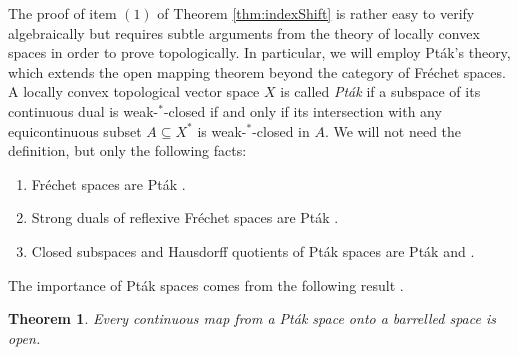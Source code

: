 \documentclass[12pt,reqno]{amsart}
\newtheorem{theorem}{Theorem}[section]
\theoremstyle{definition}
\begin{document}
The proof of item $(1)$ of Theorem \ref{thm:indexShift} is rather easy to verify algebraically but requires subtle arguments from the theory of locally convex spaces in order to prove topologically. In particular, we will employ Pt\'ak's theory, which extends the open mapping theorem beyond the category of Fr\'echet spaces. A locally convex topological vector space $X$ is called \emph{Pt\'ak} if a subspace of its continuous dual is weak-$^*$-closed if and only if its intersection with any equicontinuous subset $A \subseteq X^*$ is weak-$^*$-closed in $A$. We will not need the definition, but only the following facts:
\begin{enumerate}
    \item Fr\'echet spaces are Pt\'ak \cite[Example~IV.8.1]{SchaeferWolff}.
    \item Strong duals of reflexive Fr\'echet spaces are Pt\'ak \cite[Example~IV.8.2]{SchaeferWolff}.
    \item Closed subspaces and Hausdorff quotients of Pt\'ak spaces are Pt\'ak \cite[Theorem~IV.8.2]{SchaeferWolff} and \cite[Corollary~IV.8.3]{SchaeferWolff}.
\end{enumerate}
The importance of Pt\'ak spaces comes from the following result \cite[Corollary~IV.8.1]{SchaeferWolff}.
\begin{theorem}\label{ptak}
    Every continuous map from a Pt\'ak space onto a barrelled space is open.
\end{theorem}
\end{document}
